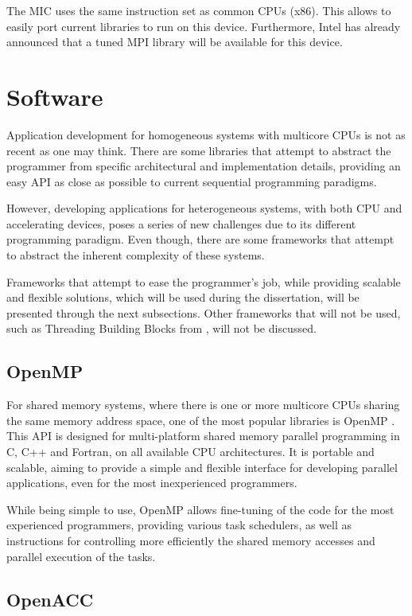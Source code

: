The MIC uses the same instruction set as common \intel CPUs (x86). This allows to easily port current libraries to run on this device. Furthermore, Intel has already announced that a tuned MPI library will be available for this device.

\section{Software}

Application development for homogeneous systems with multicore CPUs is not as recent as one may think. There are some libraries that attempt to abstract the programmer from specific architectural and implementation details, providing an easy API as close as possible to current sequential programming paradigms.

However, developing applications for heterogeneous systems, with both CPU and accelerating devices, poses a series of new challenges due to its different programming paradigm. Even though, there are some frameworks that attempt to abstract the inherent complexity of these systems.

Frameworks that attempt to ease the programmer’s job, while providing scalable and flexible solutions, which will be used during the dissertation, will be presented through the next subsections. Other frameworks that will not be used, such as Threading Building Blocks from \intel \cite{Intel:TBB}, will not be discussed.

\subsection{OpenMP}

For shared memory systems, where there is one or more multicore CPUs sharing the same memory address space, one of the most popular libraries is OpenMP \cite{OpenMP}. This API is designed for multi-platform shared memory parallel programming in C, C++ and Fortran, on all available CPU architectures. It is portable and scalable, aiming to provide a simple and flexible interface for developing parallel applications, even for the most inexperienced programmers.

While being simple to use, OpenMP allows fine-tuning of the code for the most experienced programmers, providing various task schedulers, as well as instructions for controlling more efficiently the shared memory accesses and parallel execution of the tasks.

\subsection{OpenACC}

